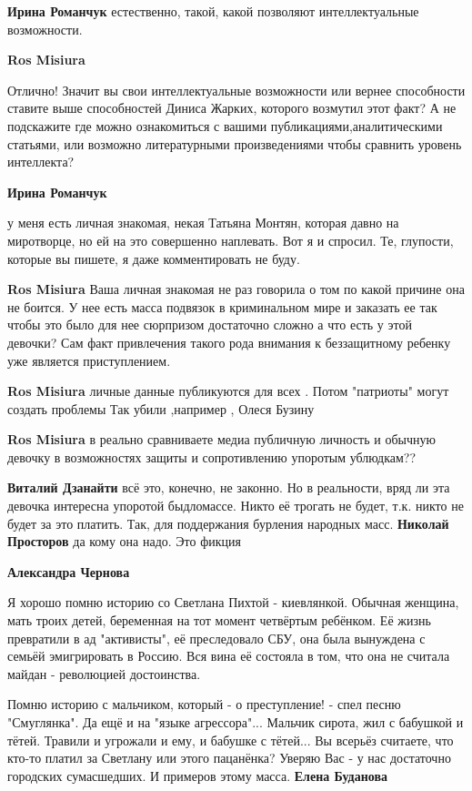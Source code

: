 \begin{itemize}
\begin{itemize}
\textbf{Ирина Романчук} естественно, такой, какой позволяют интеллектуальные возможности.

\textbf{Ros Misiura} 

Отлично! Значит вы свои интеллектуальные возможности или вернее способности
ставите выше способностей Диниса Жарких, которого возмутил этот факт? А не
подскажите где можно ознакомиться с вашими публикациями,аналитическими
статьями, или возможно литературными произведениями чтобы сравнить уровень
интеллекта?

\textbf{Ирина Романчук} 

у меня есть личная знакомая, некая Татьяна Монтян, которая давно на миротворце,
но ей на это совершенно наплевать. Вот я и спросил. Те, глупости, которые вы
пишете, я даже комментировать не буду.

\textbf{Ros Misiura} Ваша личная знакомая не раз говорила о том по какой причине она не боится. У нее есть масса подвязок в криминальном мире и заказать ее так чтобы это было для нее сюрпризом достаточно сложно а что есть у этой девочки? Сам факт привлечения такого рода внимания к беззащитному ребенку уже является приступлением.

\textbf{Ros Misiura} личные данные публикуются для всех . Потом "патриоты" могут создать проблемы Так убили ,например , Олеся Бузину

\textbf{Ros Misiura} в реально сравниваете медиа публичную личность и обычную девочку в возможностях защиты и сопротивлению упоротым ублюдкам??

\textbf{Виталий Дзанайти} всё это, конечно, не законно. Но в реальности, вряд ли эта девочка интересна упоротой быдломассе. Никто её трогать не будет, т.к. никто не будет за это платить. Так, для поддержания бурления народных масс.
\textbf{Николай Просторов} да кому она надо. Это фикция

\textbf{Александра Чернова} 

Я хорошо помню историю со Светлана Пихтой - киевлянкой.  Обычная женщина, мать
троих детей, беременная на тот момент четвёртым ребёнком. Её жизнь превратили в
ад "активисты", её преследовало СБУ, она была вынуждена с семьёй эмигрировать в
Россию. Вся вина её состояла в том, что она не считала майдан - революцией
достоинства.

Помню историю с мальчиком, который - о преступление! - спел песню "Смуглянка". Да ещё и на "языке агрессора"...
Мальчик сирота, жил с бабушкой и тётей. Травили и угрожали и ему, и бабушке с тётей...
Вы всерьёз считаете, что кто-то платил за Светлану или этого пацанёнка?
Уверяю Вас - у нас достаточно городских сумасшедших.
И примеров этому масса.
\textbf{Елена Буданова} 


\end{itemize}
\end{itemize}

